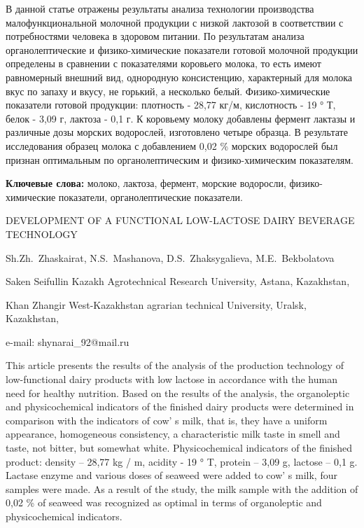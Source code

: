 В данной статье отражены результаты анализа технологии производства
малофункциональной молочной продукции с низкой лактозой в соответствии с
потребностями человека в здоровом питании. По результатам анализа
органолептические и физико-химические показатели готовой молочной
продукции определены в сравнении с показателями коровьего молока, то
есть имеют равномерный внешний вид, однородную консистенцию, характерный
для молока вкус по запаху и вкусу, не горький, а несколько белый.
Физико-химические показатели готовой продукции: плотность - 28,77
кг/м, кислотность - 19 ° Т, белок - 3,09 г, лактоза -
0,1 г. К коровьему молоку добавлены фермент лактазы и различные дозы
морских водорослей, изготовлено четыре образца. В результате
исследования образец молока с добавлением 0,02 \% морских водорослей был
признан оптимальным по органолептическим и физико-химическим
показателям.

{\bfseries Ключевые слова:} молоко, лактоза, фермент, морские водоросли,
физико-химические показатели, органолептические показатели.

\begin{header}
DEVELOPMENT OF A FUNCTIONAL LOW-LACTOSE DAIRY BEVERAGE TECHNOLOGY

Sh.Zh.~Zhaskairat\envelope,
N.S.~Mashanova,
D.S.~Zhaksygalieva,
M.E.~Bekbolatova
\end{header}

\begin{affil}
Saken Seifullin Kazakh Agrotechnical Research University, Astana, Kazakhstan,

Khan Zhangir West-Kazakhstan agrarian technical University, Uralsk, Kazakhstan,

e-mail: shynarai\_92@mail.ru
\end{affil}

This article presents the results of the analysis of the production
technology of low-functional dairy products with low lactose in
accordance with the human need for healthy nutrition. Based on the
results of the analysis, the organoleptic and physicochemical indicators
of the finished dairy products were determined in comparison with the
indicators of cow' s milk, that is, they have a uniform
appearance, homogeneous consistency, a characteristic milk taste in
smell and taste, not bitter, but somewhat white. Physicochemical
indicators of the finished product: density -- 28,77 kg /
m, acidity - 19 ° T, protein -- 3,09 g, lactose --
0,1 g. Lactase enzyme and various doses of seaweed were added to
cow' s milk, four samples were made. As a result of the
study, the milk sample with the addition of 0,02 \% of seaweed was
recognized as optimal in terms of organoleptic and physicochemical
indicators.

